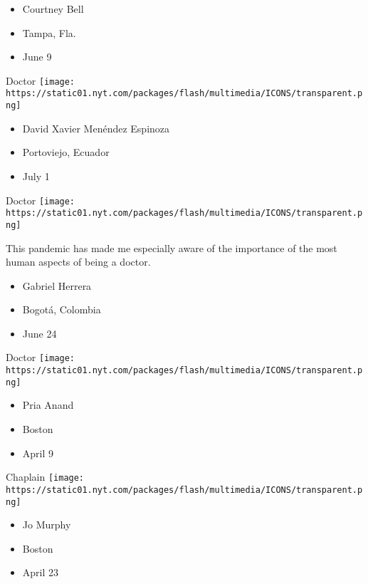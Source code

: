 \begin{itemize}
\tightlist
\item
  Courtney Bell
\item
  Tampa, Fla.
\item
  June 9
\end{itemize}

\protect\hyperlink{item-david-xavier-menendez-espinoza}{}

Doctor
\texttt{[image: https://static01.nyt.com/packages/flash/multimedia/ICONS/transparent.png]}

\begin{itemize}
\tightlist
\item
  David Xavier Menéndez Espinoza
\item
  Portoviejo, Ecuador
\item
  July 1
\end{itemize}

\protect\hyperlink{item-gabriel-herrera}{}

Doctor
\texttt{[image: https://static01.nyt.com/packages/flash/multimedia/ICONS/transparent.png]}

This pandemic has made me especially aware of the importance of the most
human aspects of being a doctor.

\begin{itemize}
\tightlist
\item
  Gabriel Herrera
\item
  Bogotá, Colombia
\item
  June 24
\end{itemize}

\protect\hyperlink{item-pria-anand}{}

Doctor
\texttt{[image: https://static01.nyt.com/packages/flash/multimedia/ICONS/transparent.png]}

\begin{itemize}
\tightlist
\item
  Pria Anand
\item
  Boston
\item
  April 9
\end{itemize}

\protect\hyperlink{item-jo-murphy}{}

Chaplain
\texttt{[image: https://static01.nyt.com/packages/flash/multimedia/ICONS/transparent.png]}

\begin{itemize}
\tightlist
\item
  Jo Murphy
\item
  Boston
\item
  April 23
\end{itemize}

